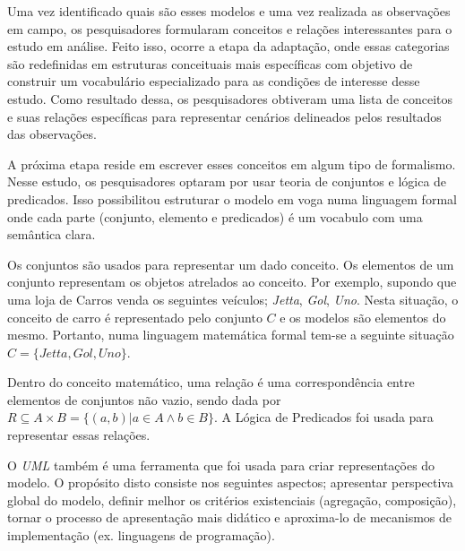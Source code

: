Uma vez identificado quais são esses modelos e uma vez realizada as observações em campo, os pesquisadores formularam conceitos e relações interessantes para o estudo em análise. Feito isso, ocorre a etapa da adaptação, onde essas categorias são redefinidas em estruturas conceituais mais específicas com objetivo de construir um vocabulário especializado para as condições de interesse desse estudo. Como resultado dessa, os pesquisadores obtiveram uma lista de conceitos e suas relações específicas para representar cenários delineados pelos resultados das observações. 

A próxima etapa reside em escrever esses conceitos em algum tipo de formalismo. Nesse estudo, os pesquisadores optaram por usar teoria de conjuntos e lógica de predicados. Isso possibilitou estruturar o modelo em voga numa linguagem formal onde cada parte (conjunto, elemento e predicados) é um vocabulo com uma semântica clara. 

Os conjuntos são usados para representar um dado conceito. Os elementos de um conjunto representam os objetos atrelados ao conceito. Por exemplo, supondo que uma loja de Carros venda os seguintes veículos; \textit{Jetta}, \textit{Gol}, \textit{Uno}.
Nesta situação, o conceito de carro é representado pelo conjunto $C$ e os modelos são elementos do mesmo. Portanto, numa linguagem matemática formal tem-se a seguinte situação $C = \{Jetta,Gol,Uno\}$. 

Dentro do conceito matemático, uma relação é uma correspondência entre elementos de conjuntos não vazio, sendo dada por $R \subseteq  A \times B = \{(a,b)| a \in A \wedge b \in B \}$. A Lógica de Predicados foi usada para representar essas
relações.

O \textit{UML} também é uma ferramenta que foi usada para criar representações do modelo. O propósito disto consiste nos seguintes aspectos; apresentar perspectiva global do modelo, definir melhor os critérios existenciais (agregação, composição),
tornar o processo de apresentação mais didático e aproxima-lo de mecanismos de implementação (ex. linguagens de programação). 